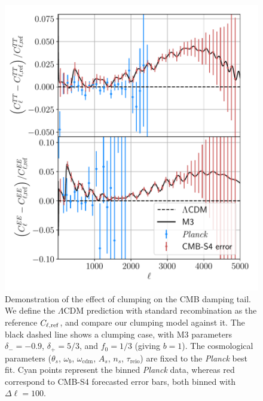 \begin{figure}[htp]
\includegraphics[width=\columnwidth]{img/M3demo-damping.pdf}
\caption[Demonstration of the effect of clumping on the CMB damping tail]{
Demonstration of the effect of clumping on the CMB damping tail.
We define the $\Lambda$CDM prediction with standard recombination as the reference $C_{\ell,\rm ref}$, and compare our clumping model against it.
The black dashed line shows a clumping case, with M3 parameters $\delta_-=-0.9$, $\delta_+=5/3$, and $f_0=1/3$ (giving $b=1$). 
The cosmological parameters ($\theta_s$, $\omega_b$, $\omega_\mathrm{cdm}$, $A_s$, $n_s$, $\tau_\mathrm{reio}$) are fixed to the {\it Planck} best fit. 
Cyan points represent the binned {\it Planck} data, whereas red correspond to CMB-S4 forecasted error bars, both binned with $\Delta \ell=100$.}
\label{fig:M3demo-damping}
\end{figure}

